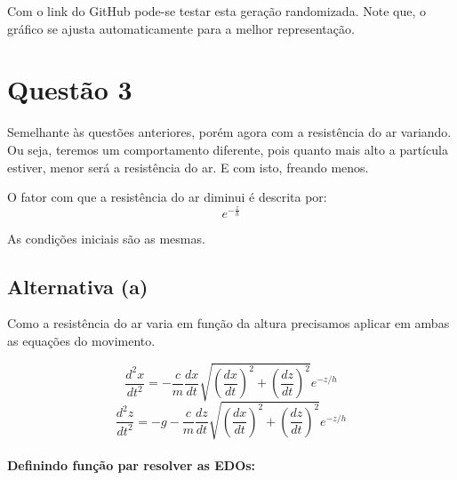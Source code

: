 \documentclass[12pt, a4paper]{article}
\begin{document}
Com o link do GitHub pode-se testar esta geração randomizada. Note que,
o gráfico se ajusta automaticamente para a melhor representação.

\hypertarget{questuxe3o-3}{%
\section{Questão 3}\label{questuxe3o-3}}

Semelhante às questões anteriores, porém agora com a resistência do ar
variando. Ou seja, teremos um comportamento diferente, pois quanto mais
alto a partícula estiver, menor será a resistência do ar. E com isto,
freando menos.

O fator com que a resistência do ar diminui é descrita por:
\[e^{-\frac{z}{h}}\]

As condições iniciais são as mesmas.

\hypertarget{alternativa-a}{%
\subsection{Alternativa (a)}\label{alternativa-a}}

Como a resistência do ar varia em função da altura precisamos aplicar em
ambas as equações do movimento.

\[ \frac{d^2x}{dt^2} = - \frac{c}{m} \frac{dx}{dt}\sqrt{\left(\frac{dx}{dt} \right)^2 + \left(\frac{dz}{dt} \right)^2} e^{-z/h}
\]
\[\frac{d^2z}{dt^2} = - g - \frac{c}{m} \frac{dz}{dt}\sqrt{\left(\frac{dx}{dt} \right)^2 + \left(\frac{dz}{dt} \right)^2} e^{-z/h}
\]

\hypertarget{definindo-funuxe7uxe3o-par-resolver-as-edos}{%
\paragraph{Definindo função par resolver as
EDOs:}\label{definindo-funuxe7uxe3o-par-resolver-as-edos}}
\end{document}
